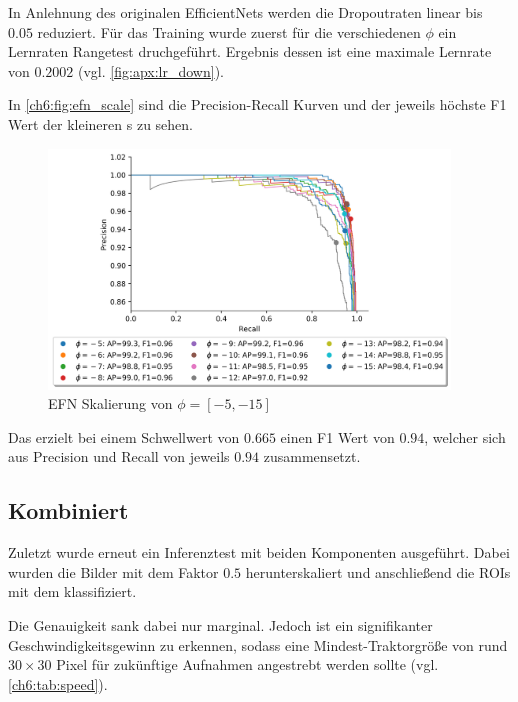 \bigskip
In Anlehnung des originalen EfficientNets werden die Dropoutraten linear bis $0.05$ reduziert.
Für das Training wurde zuerst für die verschiedenen $\phi$ ein Lernraten Rangetest druchgeführt.
Ergebnis dessen ist eine maximale Lernrate von $0.2002$ (vgl. \autoref{fig:apx:lr_down}).

In \autoref{ch6:fig:efn_scale} sind die Precision-Recall Kurven und der jeweils höchste F1 Wert der kleineren s zu sehen.

\begin{figure}[ht]
    \begin{small}
        \begin{center}
            \includegraphics[width=0.95\textwidth]{figures/chapter_6/efn_scaled-pr_curve}
        \end{center}
        \caption{EFN Skalierung von $\phi=[-5,-15]$}
        \label{ch6:fig:efn_scale}
    \end{small}
\end{figure}

Das  erzielt bei einem Schwellwert von $0.665$ einen F1 Wert von $0.94$, welcher sich aus Precision und Recall von jeweils $0.94$ zusammensetzt.


\subsection*{Kombiniert}
Zuletzt wurde erneut ein Inferenztest mit beiden Komponenten ausgeführt.
Dabei wurden die Bilder mit dem Faktor $0.5$ herunterskaliert und anschließend die \acp{ROI} mit dem  klassifiziert.

Die Genauigkeit sank dabei nur marginal.
Jedoch ist ein signifikanter Geschwindigkeitsgewinn zu erkennen, sodass eine Mindest-Traktorgröße von rund $30 \times 30$ Pixel für zukünftige Aufnahmen angestrebt werden sollte (vgl. \autoref{ch6:tab:speed}).

